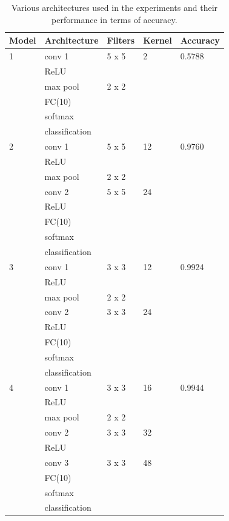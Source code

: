 \documentclass[11pt,conference,compsoc]{IEEEtran}
\begin{document}
\begin{table}[h]
\centering
\begin{tabular}[t]{l l l l | l}
\toprule
  Model & Architecture & Filters & Kernel &Accuracy\\
\midrule
  1 & conv 1 &   5 x 5 &      2  & 0.5788\\
  &  ReLU &    &       &          \\
  & max pool &   2 x 2 &              \\
  &  FC(10) & \\
  &  softmax & \\
  &  classification & \\
  

\midrule                                                  
  2 & conv 1 &   5 x 5 &      12 &  0.9760\\
  &  ReLU &    &       &          \\
  & max pool &   2 x 2 &       &  \\
  & conv 2 &   5 x 5 &      24 &  \\
  &  ReLU &    &       &          \\
  &  FC(10) & \\
  &  softmax & \\
  &  classification & \\

\midrule                                                  
  3 & conv 1 &   3 x 3 &      12 & 0.9924\\
  &  ReLU &    &       &          \\
  & max pool &   2 x 2 &        \\
  & conv 2 &   3 x 3 &      24 &\\
  &  ReLU &    &       &         \\
  &  FC(10) & \\
  &  softmax & \\
  &  classification & \\
  
\midrule                                                  
  4 & conv 1 &   3 x 3 &      16 & 0.9944\\
  &  ReLU &    &       &          \\
  & max pool &   2 x 2 &        \\
  & conv 2 &   3 x 3 &      32 &\\
  &  ReLU &    &       &          \\
  & conv 3 &   3 x 3 &      48 &\\
  &  FC(10) & \\
  &  softmax & \\
  &  classification & \\

\bottomrule
\end{tabular}

\label{tab:cnn}

\caption{Various architectures used in the experiments and their performance in terms of accuracy.}
\label{cnn}
\end{table}
\end{document}
